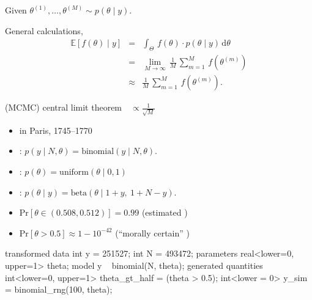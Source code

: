 \documentclass[10pt]{report}
\begin{document}
\begin{subitemize}
\item Given  $\theta^{(1)}, \ldots, \theta^{(M)} \sim p(\theta \mid y).$
\item General  calculations,
\begin{eqnarray*}
\mathbb{E}[f(\theta) \mid y]
& = &
\int_{\Theta} \, f(\theta) \cdot p(\theta \mid y) \, \textrm{d}\theta
\\[8pt]
& = &
\lim_{M \rightarrow \infty} \,
\frac{1}{M} \, \sum_{m=1}^M \, f\!\left(\theta^{(m)}\right)
\\[8pt]
& \approx &
\frac{1}{M} \, \sum_{m=1}^M \, f\!\left(\theta^{(m)}\right).
\end{eqnarray*}
\item (MCMC) central limit theorem  $\mbox{ } \propto \frac{\displaystyle 1}{\displaystyle \sqrt{M}}$
\end{subitemize}


\begin{itemize}
\item {} in Paris, 1745--1770
\item {}:
$p(y \mid N, \theta)
 = \textrm{binomial}(y \mid N, \theta).$
\item {}:
$p(\theta)
 = \textrm{uniform}(\theta \mid 0, 1)$
\item {}:
$p(\theta \mid y)
 = \textrm{beta}(\theta \mid 1 + y, \ 1 + N - y).$
\vfill
\item {$\textrm{Pr}[\theta \in (0.508, 0.512)] = 0.99$}
\hfill {\small (estimated )}
\item {$\textrm{Pr}[\theta > 0.5] \approx 1 - 10^{-42}$}
\hfill {\small (``morally certain'' )}
\end{itemize}

\begin{stancode}
transformed data {
  int y = 251527;  int N = 493472;
}
parameters {
  real<lower=0, upper=1> theta;
}
model {
  y ~ binomial(N, theta);
}
generated quantities {
  int<lower=0, upper=1> theta_gt_half = (theta > 0.5);
  int<lower = 0> y_sim = binomial_rng(100, theta);
}
\end{stancode}
\end{document}
